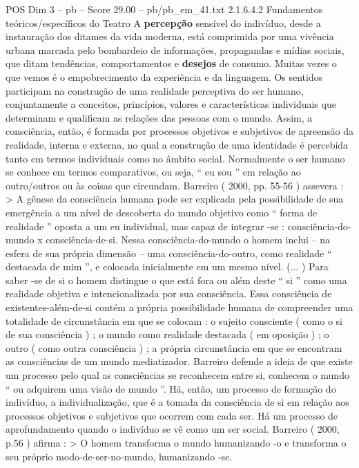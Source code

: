 \begin{textsample}{POS Dim 3 – pb – Score 29.00 – pb/pb\_em\_41.txt}  \label{ex:f3_pos_082}
2.1.6.4.2 Fundamentos teóricos/específicos do Teatro A \textbf{percepção} sensível do indivíduo, desde a instauração dos ditames da vida moderna, está comprimida por uma vivência urbana marcada pelo bombardeio de informações, propagandas e mídias sociais, que ditam tendências, comportamentos e \textbf{desejos} de consumo.
Muitas vezes o que vemos é o empobrecimento da experiência e da linguagem.
Os sentidos participam na construção de uma realidade perceptiva do ser humano, conjuntamente a conceitos, princípios, valores e características individuais que determinam e qualificam as relações das pessoas com o mundo.
Assim, a consciência, então, é formada por processos objetivos e subjetivos de apreensão da realidade, interna e externa, no qual a construção de uma identidade é percebida tanto em termos individuais como no âmbito social.
Normalmente o ser humano se conhece em termos comparativos, ou seja, “ eu sou ” em relação ao outro/outros ou às coisas que circundam.
Barreiro ( 2000, pp. 55-56 ) assevera : > A gênese da consciência humana pode ser explicada pela possibilidade de sua emergência a um nível de descoberta do mundo objetivo como “ forma de realidade ” oposta a um eu individual, mas capaz de integrar -se : consciência-do-mundo x consciência-de-si.
Nessa consciência-do-mundo o homem inclui – na esfera de sua própria dimensão – uma consciência-do-outro, como realidade “ destacada de mim ”, e colocada inicialmente em um mesmo nível. (... ) Para saber -se de si o homem distingue o que está fora ou além deste “ si ” como uma realidade objetiva e intencionalizada por sua consciência.
Essa consciência de existentes-além-de-si contém a própria possibilidade humana de compreender uma totalidade de circunstância em que se colocam : o sujeito consciente ( como o si de sua consciência ) ; o mundo como realidade destacada ( em oposição ) ; o outro ( como outra consciência ) ; a própria circunstância em que se encontram as consciências de um mundo mediatizador.
Barreiro defende a ideia de que existe um processo pelo qual as consciências se reconhecem entre si, conhecem o mundo “ ou adquirem uma visão de mundo ”.
Há, então, um processo de formação do indivíduo, a individualização, que é a tomada da consciência de si em relação aos processos objetivos e subjetivos que ocorrem com cada ser.
Há um processo de aprofundamento quando o indivíduo se vê como um ser social.
Barreiro ( 2000, p.56 ) afirma : > O homem transforma o mundo humanizando -o e transforma o seu próprio modo-de-ser-no-mundo, humanizando -se.

\end{textsample}
